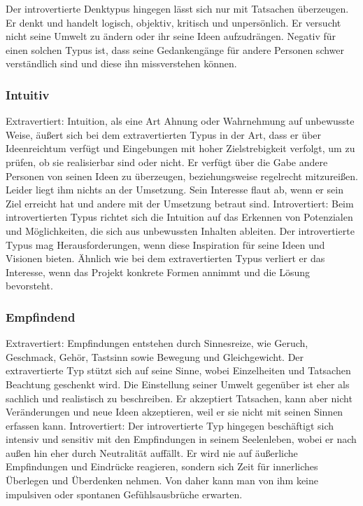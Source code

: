 Der introvertierte Denktypus hingegen lässt sich nur mit Tatsachen überzeugen. 
Er denkt und handelt logisch, objektiv, kritisch und unpersönlich. Er versucht nicht 
seine Umwelt zu ändern oder ihr seine Ideen aufzudrängen. Negativ für einen solchen Typus ist, dass seine Gedankengänge für andere Personen schwer verständlich 
sind und diese ihn missverstehen können.
\subsubsection{Intuitiv}
Extravertiert: 
Intuition, als eine Art Ahnung oder Wahrnehmung auf unbewusste Weise, äußert sich 
bei dem extravertierten Typus in der Art, dass er über Ideenreichtum verfügt und 
Eingebungen mit hoher Zielstrebigkeit verfolgt, um zu prüfen, ob sie realisierbar sind 
oder nicht. Er verfügt über die Gabe andere Personen von seinen Ideen zu überzeugen, 
beziehungsweise regelrecht mitzureißen. Leider liegt ihm nichts an der Umsetzung. 
Sein Interesse flaut ab, wenn er sein Ziel erreicht hat und andere mit der Umsetzung 
betraut sind. 
Introvertiert: 
Beim introvertierten Typus richtet sich die Intuition auf das Erkennen von Potenzialen und Möglichkeiten, die sich aus unbewussten Inhalten ableiten. Der introvertierte 
Typus mag Herausforderungen, wenn diese Inspiration für seine Ideen und Visionen 
bieten. Ähnlich wie bei dem extravertierten Typus verliert er das Interesse, wenn das 
Projekt konkrete Formen annimmt und die Lösung bevorsteht.
\subsubsection{Empfindend}
Extravertiert: 
Empfindungen entstehen durch Sinnesreize, wie Geruch, Geschmack, Gehör, Tastsinn 
sowie Bewegung und Gleichgewicht. Der extravertierte Typ stützt sich auf seine 
Sinne, wobei Einzelheiten und Tatsachen Beachtung geschenkt wird. Die Einstellung seiner Umwelt gegenüber ist eher als sachlich und realistisch zu beschreiben. Er akzeptiert Tatsachen, kann aber nicht Veränderungen und neue Ideen akzeptieren, weil 
er sie nicht mit seinen Sinnen erfassen kann. 
Introvertiert: 
Der introvertierte Typ hingegen beschäftigt sich intensiv und sensitiv mit den Empfindungen in seinem Seelenleben, wobei er nach außen hin eher durch Neutralität auffällt. Er wird nie auf äußerliche Empfindungen und Eindrücke reagieren, sondern sich 
Zeit für innerliches Überlegen und Überdenken nehmen. Von daher kann man von 
ihm keine impulsiven oder spontanen Gefühlsausbrüche erwarten.




